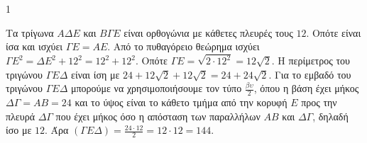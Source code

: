 \begin{ylh}{1}
    \item [Ύλη από εικόνα]
\end{ylh}

\begin{alist}
\item \begin{figure}
    \centering
\end{figure}
Τα τρίγωνα $A\Delta E$ και $B\Gamma E$ είναι ορθογώνια με κάθετες πλευρές τους $12$.
Οπότε είναι ίσα και ισχύει $\Gamma E = AE$. Από το πυθαγόρειο θεώρημα ισχύει $\Gamma E^2 = \Delta E^2 + 12^2 = 12^2 + 12^2$. Οπότε $\Gamma E = \sqrt{2 \cdot 12^2} = 12\sqrt{2}$.
Η περίμετρος του τριγώνου $\Gamma E\Delta$ είναι ίση με $24 + 12\sqrt{2} + 12\sqrt{2} = 24 + 24\sqrt{2}$.
Για το εμβαδό του τριγώνου $\Gamma E\Delta$ μπορούμε να χρησιμοποιήσουμε τον τύπο $\frac{\beta\upsilon}{2}$, όπου η βάση έχει μήκος $\Delta\Gamma = AB = 24$ και το ύψος είναι το κάθετο τμήμα από την κορυφή $E$ προς την πλευρά $\Delta\Gamma$ που έχει μήκος όσο η απόσταση των παραλλήλων $AB$ και $\Delta\Gamma$, δηλαδή ίσο με $12$.
Άρα $(\Gamma E\Delta) = \frac{24 \cdot 12}{2} = 12 \cdot 12 = 144$.
\item \begin{rlist}
\item \begin{figure}
    \centering
\end{figure}
\end{rlist}
\end{alist}
